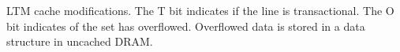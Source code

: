 

%
{LTM cache modifications. The T bit indicates if the line is
transactional. The O bit indicates of the set has
overflowed. Overflowed data is stored in a data structure in uncached
DRAM.}

